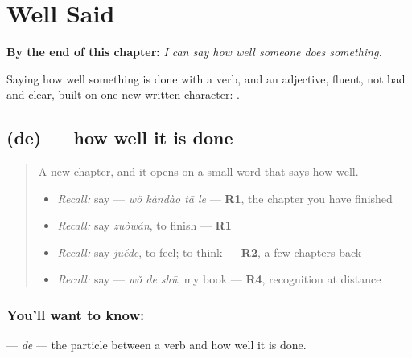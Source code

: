 
\chapter{Well Said}
\label{ch:zh-well-said}

\begin{chapteropening}
\textbf{By the end of this chapter:} \emph{I can say how well someone does something.}

Saying how well something is done with a verb,  and an adjective, fluent, not bad and clear, built on one new written character: .
\end{chapteropening}

\section[\texorpdfstring{\zh{得} (de)}{得 (de)}]{ (de) — how well it is done}

\label{lesson:ZH-C152-de-complement}



\begin{quote}
A new chapter, and it opens on a small word that says how well.

\begin{itemize}
\raggedright
  \item \emph{Recall:} say  — \emph{wǒ kàndào tā le} — \textbf{R1}, the chapter you have finished
  \item \emph{Recall:} say \emph{zuòwán}, to finish — \textbf{R1}
  \item \emph{Recall:} say \emph{juéde}, to feel; to think — \textbf{R2}, a few chapters back
  \item \emph{Recall:} say  — \emph{wǒ de shū}, my book — \textbf{R4}, recognition at distance
\end{itemize}
\end{quote}

\subsection*{You'll want to know: }
\textbf{} — \emph{de} — the particle between a verb and how well it is done.

